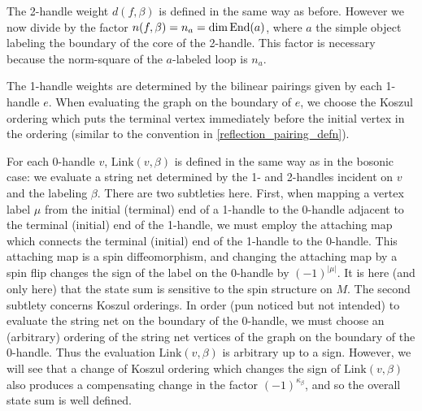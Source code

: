 The 2-handle weight $d(f, \beta)$ is defined in the same way as before. 
However we now divide by the factor $n(f, \beta) = n_a = \dim\text{End}(a)$,
where $a$ the simple object labeling the boundary of the core of the 2-handle.
This factor is necessary because the norm-square of the $a$-labeled loop is $n_a$.

The 1-handle weights are determined by the bilinear pairings given by each 1-handle $e$. 
When evaluating the graph on the boundary of $e$, we choose the Koszul ordering which puts the terminal vertex
immediately before the initial vertex in the ordering (similar to the convention in \eqref{reflection_pairing_defn}).

For each 0-handle $v$, $\text{Link}(v,\beta)$ is defined in the same way as in the bosonic case:
we evaluate a string net determined by the 1- and 2-handles incident on $v$ and the labeling $\beta$.
There are two subtleties here.
First, when mapping a vertex label $\mu$ from the initial (terminal) end of a 1-handle to the 0-handle adjacent to the terminal (initial) end of the 1-handle, 
we must employ the attaching map which connects the terminal (initial) end of the 1-handle to the 0-handle.
This attaching map is a spin diffeomorphism, 
and changing the attaching map by a spin flip changes the sign
of the label on the 0-handle by $(-1)^{|\mu|}$.
It is here (and only here) that the state sum is sensitive to the spin structure on $M$.
The second subtlety concerns Koszul orderings.
In order (pun noticed but not intended)
to evaluate the string net on the boundary of the 0-handle, we must choose an (arbitrary) ordering
of the string net vertices of the graph on the boundary of the 0-handle.
Thus the evaluation $\text{Link}(v, \beta)$ is arbitrary up to a sign.
However, we will see that a change of Koszul ordering which changes the sign of $\text{Link}(v, \beta)$ also produces a compensating
change in the factor $(-1)^{\kappa_\beta}$, and so the overall state sum is well defined.

